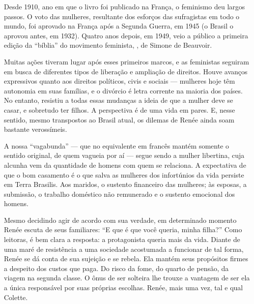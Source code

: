 \begin{multicols}{2}
\vspace{\baselineskip}

{\small{}}

\vspace{\baselineskip}

Desde 1910, ano em que o livro foi publicado na França, o feminismo deu largos passos. O voto das mulheres, resultante dos esforços das sufragistas em todo o mundo, foi aprovado na França após a Segunda Guerra, em 1945 (o Brasil o aprovou antes, em 1932). Quatro anos depois, em 1949, veio a público a primeira edição da “bíblia” do movimento feminista, {}, de Simone de Beauvoir.

Muitas ações tiveram lugar após esses primeiros marcos, e as feministas seguiram em busca de diferentes tipos de liberação e ampliação de direitos. Houve avanços expressivos quanto aos direitos políticos, civis e sociais --- mulheres hoje têm autonomia em suas famílias, e o divórcio é letra corrente na maioria dos países. No entanto, resistiu a todas essas mudanças a ideia de que a mulher deve se casar, e sobretudo ter filhos. A perspectiva é de uma vida em pares. E, nesse sentido, mesmo transpostos ao Brasil atual, os dilemas de Renée ainda soam bastante verossímeis. 

A nossa “vagabunda” --- que no equivalente em francês {} mantém somente o sentido original, de quem vagueia por aí --- segue sendo a mulher libertina, cuja alcunha vem da quantidade de homens com quem se relaciona. A expectativa de que o bom casamento é o que salva as mulheres dos infortúnios da vida persiste em Terra Brasilis. Aos maridos, o sustento financeiro das mulheres; às esposas, a submissão, o trabalho doméstico não remunerado e o sustento emocional dos homens.

Mesmo decidindo agir de acordo com sua verdade, em determinado momento Renée escuta de seus familiares: “E que é que você queria, minha filha?” Como leitoras, é bem clara a resposta: a protagonista queria mais da vida. Diante de uma maré de resistência a uma sociedade acostumada a funcionar de tal forma, Renée se dá conta de sua sujeição e se rebela. Ela mantém seus propósitos firmes a despeito dos custos que paga. Do risco da fome, do quarto de pensão, da viagem na segunda classe. O ônus de ser solteira lhe trouxe a vantagem de ser ela a única responsável por suas próprias escolhas. Renée, mais uma vez, tal e qual Colette. 


\end{multicols}
